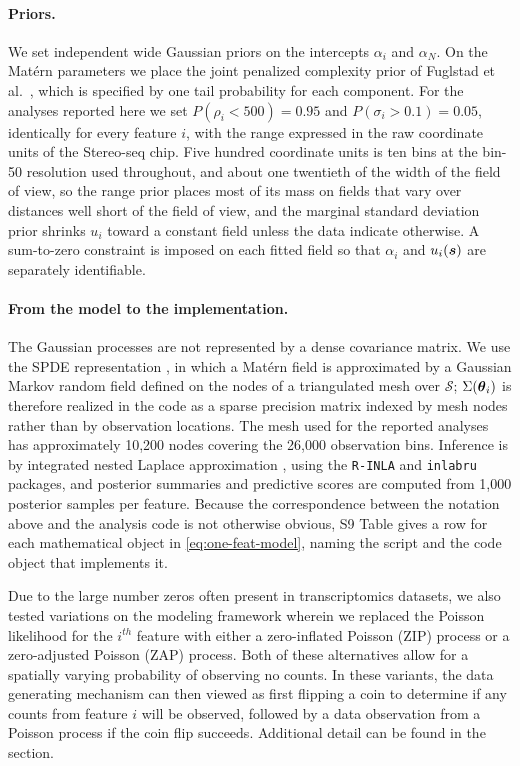 \documentclass[10pt,letterpaper]{article}
\begin{document}
\paragraph*{Priors.} We set independent wide Gaussian priors on the intercepts $\alpha_i$ and $\alpha_N$. On the Mat\'ern parameters we place the joint penalized complexity prior of Fuglstad et al.\ \cite{fuglstad2019}, which is specified by one tail probability for each component. For the analyses reported here we set $P(\rho_i < 500) = 0.95$ and $P(\sigma_i > 0.1) = 0.05$, identically for every feature $i$, with the range expressed in the raw coordinate units of the Stereo-seq chip. Five hundred coordinate units is ten bins at the bin-50 resolution used throughout, and about one twentieth of the width of the field of view, so the range prior places most of its mass on fields that vary over distances well short of the field of view, and the marginal standard deviation prior shrinks $u_i$ toward a constant field unless the data indicate otherwise. A sum-to-zero constraint is imposed on each fitted field so that $\alpha_i$ and $u_i(\mbox{\boldmath $s$})$ are separately identifiable.

\paragraph*{From the model to the implementation.} The Gaussian processes are not represented by a dense covariance matrix. We use the SPDE representation \cite{lindgren2011}, in which a Mat\'ern field is approximated by a Gaussian Markov random field defined on the nodes of a triangulated mesh over $\mathcal{S}$; $\Sigma(\mbox{\boldmath $\theta$}_i)$ is therefore realized in the code as a sparse precision matrix indexed by mesh nodes rather than by observation locations. The mesh used for the reported analyses has approximately 10{,}200 nodes covering the 26{,}000 observation bins. Inference is by integrated nested Laplace approximation \cite{rue2009}, using the \texttt{R-INLA} and \texttt{inlabru} packages, and posterior summaries and predictive scores are computed from 1{,}000 posterior samples per feature. Because the correspondence between the notation above and the analysis code is not otherwise obvious, S9 Table gives a row for each mathematical object in \eqref{eq:one-feat-model}, naming the script and the code object that implements it.

Due to the large number zeros often present in transcriptomics datasets, we also tested variations on the modeling framework wherein we replaced the Poisson likelihood for the $i^{th}$ feature with either a zero-inflated Poisson (ZIP) process or a zero-adjusted Poisson (ZAP) process. Both of these alternatives allow for a spatially varying probability of observing no counts. In these variants, the data generating mechanism can then viewed as first flipping a coin to determine if any counts from feature $i$ will be observed, followed by a data observation from a Poisson process if the coin flip succeeds. Additional detail can be found in the  section.
\end{document}
